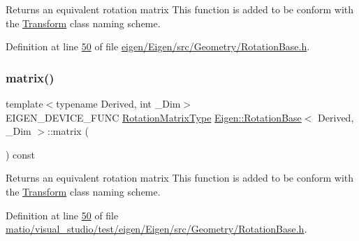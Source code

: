 \begin{DoxyReturn}{Returns}
an equivalent rotation matrix This function is added to be conform with the \hyperlink{group___geometry___module_class_eigen_1_1_transform}{Transform} class\textquotesingle{} naming scheme. 
\end{DoxyReturn}


Definition at line \hyperlink{eigen_2_eigen_2src_2_geometry_2_rotation_base_8h_source_l00050}{50} of file \hyperlink{eigen_2_eigen_2src_2_geometry_2_rotation_base_8h_source}{eigen/\+Eigen/src/\+Geometry/\+Rotation\+Base.\+h}.

\mbox{\label{class_eigen_1_1_rotation_base_a14ce23df5f0b2593a466f8130fe6bac9}} 
\subsubsection{\texorpdfstring{matrix()}{matrix()}\hspace{0.1cm}{\footnotesize\ttfamily [2/2]}}
{\footnotesize\ttfamily template$<$typename Derived, int \+\_\+\+Dim$>$ \\
E\+I\+G\+E\+N\+\_\+\+D\+E\+V\+I\+C\+E\+\_\+\+F\+U\+NC \hyperlink{class_eigen_1_1_rotation_base_a83602509674c9d635551998460342951}{Rotation\+Matrix\+Type} \hyperlink{class_eigen_1_1_rotation_base}{Eigen\+::\+Rotation\+Base}$<$ Derived, \+\_\+\+Dim $>$\+::matrix (\begin{DoxyParamCaption}{ }\end{DoxyParamCaption}) const\hspace{0.3cm}{\ttfamily [inline]}}

\begin{DoxyReturn}{Returns}
an equivalent rotation matrix This function is added to be conform with the \hyperlink{group___geometry___module_class_eigen_1_1_transform}{Transform} class\textquotesingle{} naming scheme. 
\end{DoxyReturn}


Definition at line \hyperlink{matio_2visual__studio_2test_2eigen_2_eigen_2src_2_geometry_2_rotation_base_8h_source_l00050}{50} of file \hyperlink{matio_2visual__studio_2test_2eigen_2_eigen_2src_2_geometry_2_rotation_base_8h_source}{matio/visual\+\_\+studio/test/eigen/\+Eigen/src/\+Geometry/\+Rotation\+Base.\+h}.

\mbox{\label{class_eigen_1_1_rotation_base_a4b09a2174ee14f0aa71bc0285c9045a9}} 
